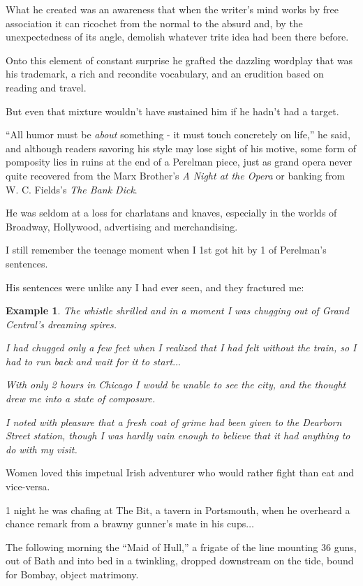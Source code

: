 \documentclass{book}
\numberwithin{equation}{section}
\newtheorem{example}{Example}[chapter]
\begin{document}
%
What he created was an awareness that when the writer's mind works by free association it can ricochet from the normal to the absurd and, by the unexpectedness of its angle, demolish whatever trite idea had been there before.

Onto this element of constant surprise he grafted the dazzling wordplay that was his trademark, a rich and recondite vocabulary, and an erudition based on reading and travel.

%
But even that mixture wouldn't have sustained him if he hadn't had a target.

``All humor must be \textit{about} something - it must touch concretely on life,'' he said, and although readers savoring his style may lose sight of his motive, some form of pomposity lies in ruins at the end of a Perelman piece, just as grand opera never quite recovered from the Marx Brother's \textit{A Night at the Opera} or banking from W. C. Fields's \textit{The Bank Dick}.

He was seldom at a loss for charlatans and knaves, especially in the worlds of Broadway, Hollywood, advertising and merchandising.

%
I still remember the teenage moment when I 1st got hit by 1 of Perelman's sentences.

His sentences were unlike any I had ever seen, and they fractured me:
\begin{example}
    The whistle shrilled and in a moment I was chugging out of Grand Central's dreaming spires.
    
    I had chugged only a few feet when I realized that I had felt without the train, so I had to run back and wait for it to start$\ldots$
    
    With only 2 hours in Chicago I would be unable to see the city, and the thought drew me into a state of composure.
    
    I noted with pleasure that a fresh coat of grime had been given to the Dearborn Street station, though I was hardly vain enough to believe that it had anything to do with my visit.
\end{example}
Women loved this impetual Irish adventurer who would rather fight than eat and vice-versa.

1 night he was chafing at The Bit, a tavern in Portsmouth, when he overheard a chance remark from a brawny gunner's mate in his cups$\ldots$

The following morning the ``Maid of Hull,'' a frigate of the line mounting 36 guns, out of Bath and into bed in a twinkling, dropped downstream on the tide, bound for Bombay, object matrimony.
\end{document}
